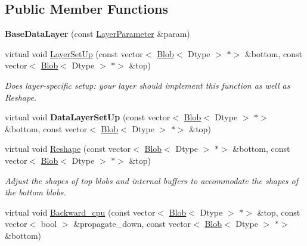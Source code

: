 \subsection*{Public Member Functions}
\begin{DoxyCompactItemize}
\item 
\mbox{\label{classcaffe_1_1_base_data_layer_abf8b0153155bc04864ebeeb4c117d7a1}} 
{\bfseries Base\+Data\+Layer} (const \mbox{\hyperlink{classcaffe_1_1_layer_parameter}{Layer\+Parameter}} \&param)
\item 
virtual void \mbox{\hyperlink{classcaffe_1_1_base_data_layer_a7028919adf87326b808a2c7b21e8e927}{Layer\+Set\+Up}} (const vector$<$ \mbox{\hyperlink{classcaffe_1_1_blob}{Blob}}$<$ Dtype $>$ $\ast$$>$ \&bottom, const vector$<$ \mbox{\hyperlink{classcaffe_1_1_blob}{Blob}}$<$ Dtype $>$ $\ast$$>$ \&top)
\begin{DoxyCompactList}\small\item\em Does layer-\/specific setup\+: your layer should implement this function as well as Reshape. \end{DoxyCompactList}\item 
\mbox{\label{classcaffe_1_1_base_data_layer_a7477b54323c917eda218e21ac43ac2f4}} 
virtual void {\bfseries Data\+Layer\+Set\+Up} (const vector$<$ \mbox{\hyperlink{classcaffe_1_1_blob}{Blob}}$<$ Dtype $>$ $\ast$$>$ \&bottom, const vector$<$ \mbox{\hyperlink{classcaffe_1_1_blob}{Blob}}$<$ Dtype $>$ $\ast$$>$ \&top)
\item 
virtual void \mbox{\hyperlink{classcaffe_1_1_base_data_layer_a2955d06a5e67609582fb293a0a37673f}{Reshape}} (const vector$<$ \mbox{\hyperlink{classcaffe_1_1_blob}{Blob}}$<$ Dtype $>$ $\ast$$>$ \&bottom, const vector$<$ \mbox{\hyperlink{classcaffe_1_1_blob}{Blob}}$<$ Dtype $>$ $\ast$$>$ \&top)
\begin{DoxyCompactList}\small\item\em Adjust the shapes of top blobs and internal buffers to accommodate the shapes of the bottom blobs. \end{DoxyCompactList}\item 
\mbox{\label{classcaffe_1_1_base_data_layer_a9d2c7a18383ff7625d80806ede1d9e3b}} 
virtual void \mbox{\hyperlink{classcaffe_1_1_base_data_layer_a9d2c7a18383ff7625d80806ede1d9e3b}{Backward\+\_\+cpu}} (const vector$<$ \mbox{\hyperlink{classcaffe_1_1_blob}{Blob}}$<$ Dtype $>$ $\ast$$>$ \&top, const vector$<$ bool $>$ \&propagate\+\_\+down, const vector$<$ \mbox{\hyperlink{classcaffe_1_1_blob}{Blob}}$<$ Dtype $>$ $\ast$$>$ \&bottom)

\end{DoxyCompactItemize}
